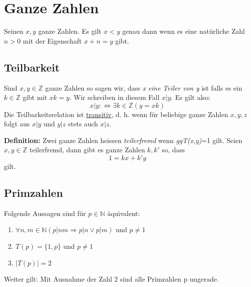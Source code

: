 \chapter{Ganze Zahlen} %
\label{cha:ganze_zahlen}
Seinen \(x,y\) ganze Zahlen. Es gilt \(x < y\) genau dann wenn es eine natürliche Zahl \(n > 0\) mit der Eigenschaft \(x+n=y\) gibt.
\section{Teilbarkeit} %
\label{sec:teilbarkeit}
Sind \(x,y \in \mathbb{Z}\) ganze Zahlen so sagen wir, dass \emph{x eine Teiler von y} ist falls es ein \(k \in \mathbb{Z}\) gibt mit \(xk = y\). Wir schreiben in diesem Fall \(x|y\). Es gilt also:
\[ x | y : \Leftrightarrow \exists k \in \mathbb{Z} (y=xk)\]
Die Teilbarkeitsrelation ist \underline{transitiv}, d. h. wenn für beliebige ganze Zahlen \(x,y,z\) folgt aus \(x|y\) und \(y|z\) stets auch \(x|z\).

\textbf{Definition:} Zwei ganze Zahlen heissen \emph{teilerfremd} wenn \emph{ggT(x,y)}=1 gilt.\newline
Seien \(x,y \in \mathbb{Z}\) teilerfremd, dann gibt es ganze Zahlen \(k, k'\) so, dass
\[ 1 = kx + k'y \]
gilt.

\section{Primzahlen} %
\label{sec:primzahlen}
Folgende Aussagen sind für \(p \in \mathbb{N}\) äquivalent:
\begin{enumerate}
	\item \( \forall{n,m} \in \mathbb{N} (p|nm \Rightarrow p|n \vee p|m)\) und \(p \neq 1\)
	\item \( T(p) = \{1,p\}\) und  \(p \neq 1\)
	\item \(|T(p)| = 2\)
\end{enumerate}
Weiter gilt:\newline
Mit Ausnahme der Zahl 2 sind alle Primzahlen p ungerade.

